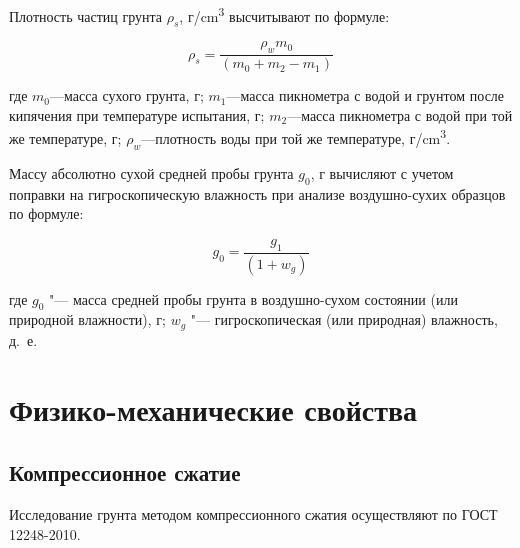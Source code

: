 Плотность частиц грунта $\rho_s$, г/\si{\centi\meter^3} высчитывают по формуле:

\[
   \rho_s = \frac{\rho_w m_0}{(m_0+m_2-m_1)}
\]

где $m_0$---масса сухого грунта, г;
$m_1$---масса пикнометра с водой и грунтом после кипячения при
температуре испытания, г;
$m_2$---масса пикнометра с водой при той же температуре, г;
$\rho_w$---плотность воды при той же температуре, г/\si{\centi\meter^3}.

Массу абсолютно сухой средней пробы грунта $g_0$, г вычисляют с
учетом поправки на гигроскопическую влажность при анализе воздушно-сухих
образцов по формуле:

\[
   g_0 = \frac{g_1}{(1 + w_g)}
\]

где $g_0$ "--- масса средней пробы грунта в воздушно-сухом состоянии (или
природной влажности), г;
$w_g$ "--- гигроскопическая (или природная) влажность, д.~е.

\section{Физико-механические свойства}\label{sec:ch6/sec2}

\subsection{Компрессионное сжатие}

Исследование грунта методом компрессионного сжатия осуществляют по ГОСТ 12248-2010.



